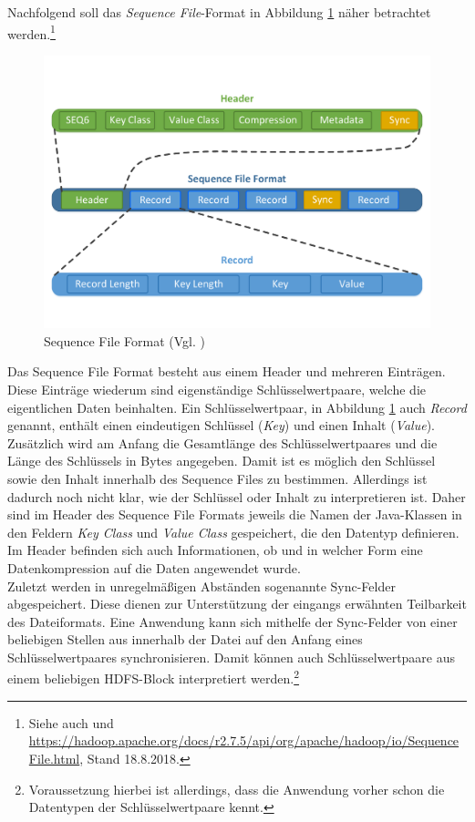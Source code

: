 \noindent
Nachfolgend soll das \textit{Sequence File}-Format in Abbildung \ref{fig:sequence_file_format} näher betrachtet werden.\footnote{Siehe auch \cite[S. 134]{hadoop_definitive_guide} und \url{https://hadoop.apache.org/docs/r2.7.5/api/org/apache/hadoop/io/SequenceFile.html}, Stand 18.8.2018.}

\begin{figure}[ht]
  \centering
  \includegraphics[width=\textwidth]{./resource/sequence_file_format.pdf}
  \caption{Sequence File Format (Vgl. \cite[S. 134]{hadoop_definitive_guide})}
  \label{fig:sequence_file_format}
\end{figure}

\noindent
Das Sequence File Format besteht aus einem Header und mehreren Einträgen. Diese Einträge wiederum sind eigenständige Schlüsselwertpaare, welche die eigentlichen Daten beinhalten. Ein Schlüsselwertpaar, in Abbildung \ref{fig:sequence_file_format} auch \textit{Record} genannt, enthält einen eindeutigen Schlüssel (\textit{Key}) und einen Inhalt (\textit{Value}). Zusätzlich wird am Anfang die Gesamtlänge des Schlüsselwertpaares und die Länge des Schlüssels in Bytes angegeben. Damit ist es möglich den Schlüssel sowie den Inhalt innerhalb des Sequence Files zu bestimmen. Allerdings ist dadurch noch nicht klar, wie der Schlüssel oder Inhalt zu interpretieren ist. Daher sind im Header des Sequence File Formats jeweils die Namen der Java-Klassen in den Feldern \textit{Key Class} und \textit{Value Class} gespeichert, die den Datentyp definieren.  
Im Header befinden sich auch Informationen, ob und in welcher Form eine Datenkompression auf die Daten angewendet wurde.\\
Zuletzt werden in unregelmäßigen Abständen sogenannte Sync-Felder abgespeichert. Diese dienen zur Unterstützung der eingangs erwähnten Teilbarkeit des Dateiformats. Eine Anwendung kann sich mithelfe der Sync-Felder von einer beliebigen Stellen aus innerhalb der Datei auf den Anfang eines Schlüsselwertpaares synchronisieren. Damit können auch Schlüsselwertpaare aus einem beliebigen HDFS-Block interpretiert werden.\footnote{Voraussetzung hierbei ist allerdings, dass die Anwendung vorher schon die Datentypen der Schlüsselwertpaare kennt.}\\ 

